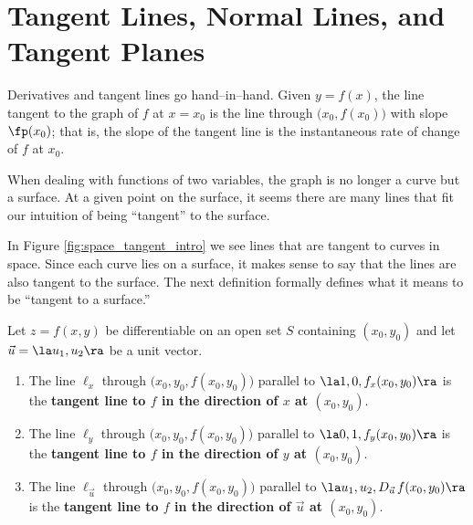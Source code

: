 \section{Tangent Lines, Normal Lines, and Tangent Planes}\label{sec:multi_tangent}

Derivatives and tangent lines go hand--in--hand. Given $y=f(x)$, the line tangent to the graph of $f$ at $x=x_0$ is the line through $\big(x_0,f(x_0)\big) $ with slope $\fp(x_0)$; that is, the slope of the tangent line is the instantaneous rate of change of $f$ at $x_0$. 

When dealing with functions of two variables, the graph is no longer a curve but a surface. At a given point on the surface, it seems there are many lines that fit our intuition of being ``tangent'' to the surface. 


In Figure \ref{fig:space_tangent_intro} we see lines that are tangent to curves in space. Since each curve lies on a  surface, it makes sense to say that the lines are also tangent to the surface. The next definition formally defines what it means to be ``tangent to a surface.'' %

\setboxwidth{10pt}
\noindent\hskip-10pt\begin{minipage}{\specialboxlength}
{Let $z=f(x,y)$ be differentiable on an open set $S$ containing $(x_0,y_0)$ and let $\vec u = \la u_1, u_2\ra$ be a unit vector.
\begin{enumerate}
	\item The line $\ell_x$ through $\big(x_0,y_0,f(x_0,y_0)\big)$ parallel to $\la 1,0,f_x(x_0,y_0)\ra$	is the \textbf{tangent line to $f$ in the direction of $x$ at $(x_0,y_0)$}.
	
	\item The line $\ell_y$  through $\big(x_0,y_0,f(x_0,y_0)\big)$ parallel to $\la 0,1,f_y(x_0,y_0)\ra$	is the \textbf{tangent line to $f$ in the direction of $y$ at $(x_0,y_0)$}.
	
	\item	 The line $\ell_{\vec u}$ through $\big(x_0,y_0,f(x_0,y_0)\big)$ parallel to $\la u_1,u_2,D_{\vec u\,}f(x_0,y_0)\ra$	is the \textbf{tangent line to $f$ in the direction of $\vec u$ at $(x_0,y_0)$}.
	\end{enumerate}
}
\end{minipage}
\restoreboxwidth

